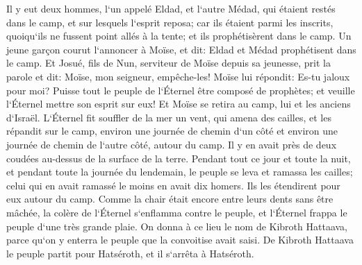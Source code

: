 \verse Il y eut deux hommes, l`un appelé Eldad, et l`autre Médad, qui étaient restés dans le camp, et sur lesquels l`esprit reposa; car ils étaient parmi les inscrits, quoiqu`ils ne fussent point allés à la tente; et ils prophétisèrent dans le camp. 
\verse Un jeune garçon courut l`annoncer à Moïse, et dit: Eldad et Médad prophétisent dans le camp. 
\verse Et Josué, fils de Nun, serviteur de Moïse depuis sa jeunesse, prit la parole et dit: Moïse, mon seigneur, empêche-les! 
\verse Moïse lui répondit: Es-tu jaloux pour moi? Puisse tout le peuple de l`Éternel être composé de prophètes; et veuille l`Éternel mettre son esprit sur eux! 
\verse Et Moïse se retira au camp, lui et les anciens d`Israël. 
\verse L`Éternel fit souffler de la mer un vent, qui amena des cailles, et les répandit sur le camp, environ une journée de chemin d`un côté et environ une journée de chemin de l`autre côté, autour du camp. Il y en avait près de deux coudées au-dessus de la surface de la terre. 
\verse Pendant tout ce jour et toute la nuit, et pendant toute la journée du lendemain, le peuple se leva et ramassa les cailles; celui qui en avait ramassé le moins en avait dix homers. Ils les étendirent pour eux autour du camp. 
\verse Comme la chair était encore entre leurs dents sans être mâchée, la colère de l`Éternel s`enflamma contre le peuple, et l`Éternel frappa le peuple d`une très grande plaie. 
\verse On donna à ce lieu le nom de Kibroth Hattaava, parce qu`on y enterra le peuple que la convoitise avait saisi. 
\verse De Kibroth Hattaava le peuple partit pour Hatséroth, et il s`arrêta à Hatséroth. 

\chapter{}

